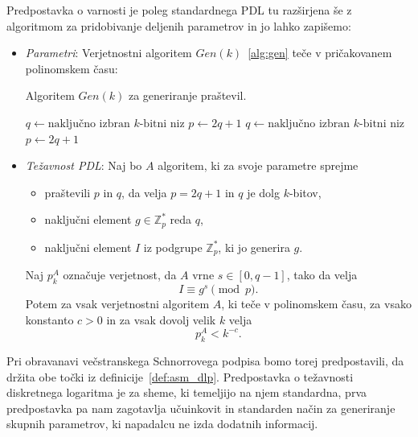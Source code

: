 \documentclass[isrm2, tisk]{fmfdelo}
\newcommand{\Z}{\mathbb Z}
\begin{document}
\begin{definicija}
\label{def:asm_dlp}
    Predpostavka o varnosti je poleg standardnega PDL tu razširjena še z algoritmom za pridobivanje 
    deljenih parametrov in jo lahko zapišemo:
    \begin{itemize}
        \item \textit{Parametri}: Verjetnostni algoritem $Gen(k)$~\ref{alg:gen} teče v pričakovanem 
            polinomskem času: 
            \begin{algorithm}
                \caption{Algoritem $Gen(k)$ za generiranje praštevil.}
                \label{alg:gen}
                \begin{algorithmic}
                    \State $q \gets \text{naključno izbran $k$-bitni niz}$
                    \State $p \gets 2q + 1$
                        \State $q \gets \text{naključno izbran $k$-bitni niz}$
                        \State $p \gets 2q + 1$
                    \EndWhile
                    \State {}
                \end{algorithmic}
            \end{algorithm}
        \item \textit{Težavnost PDL}: Naj bo $A$ algoritem, ki za svoje parametre sprejme 
            \begin{itemize}
                \item praštevili $p$ in $q$, da velja $p = 2q + 1$ in $q$ je dolg $k$-bitov,
                \item naključni element $g \in \Z_p^*$ reda $q$,
                \item naključni element $I$ iz podgrupe $\Z_p^*$, ki jo generira $g$.
            \end{itemize}
            Naj $p_k^A$ označuje verjetnost, da $A$ vrne $s \in [0, q - 1]$, tako da velja
            $$
            I \equiv g^s \pmod p.
            $$
            Potem za vsak verjetnostni algoritem $A$, ki teče v polinomskem času, za vsako konstanto 
            $c > 0$ in za vsak dovolj velik $k$ velja 
            $$ 
            p_k^A < k^{-c}.
            $$
    \end{itemize}
\end{definicija}

Pri obravanavi večstranskega Schnorrovega podpisa bomo torej predpostavili, da držita obe točki iz
definicije~\ref{def:asm_dlp}. Predpostavka o težavnosti diskretnega logaritma je za sheme, ki temeljijo
na njem standardna, prva predpostavka pa nam zagotavlja učuinkovit in standarden način za generiranje
skupnih parametrov, ki napadalcu ne izda dodatnih informacij.
\end{document}
